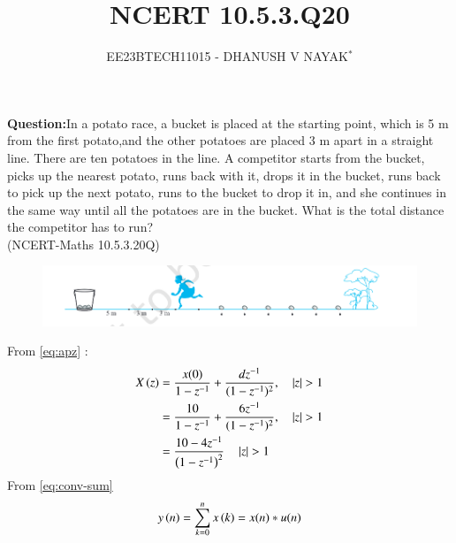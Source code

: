 \documentclass[journal,12pt,twocolumn]{IEEEtran}
\theoremstyle{remark}
\begin{document}

\title{NCERT 10.5.3.Q20}
\author{EE23BTECH11015 - DHANUSH V NAYAK$^{*}$%
}
\maketitle
\newpage
\bigskip
\renewcommand{\thefigure}{\arabic{figure}}
\renewcommand{\thetable}{\theenumi}
\textbf{Question:}In a potato race, a bucket is placed at the starting point, which is 5 m from the first potato,and the other potatoes are placed 3 m apart in a straight line. There are ten potatoes in the line. A competitor starts from the bucket, picks up the nearest potato, runs back with it, drops it in the bucket, runs back to pick up the next potato, runs to the bucket to drop it in, and she continues in the same way until all the potatoes are in the bucket. What is the total distance the competitor has to run?\\
\hfill(NCERT-Maths 10.5.3.20Q)
\begin{figure}[H]
    \includegraphics[width=1\columnwidth]{figs/questionfig.png}
    \label{fig:questionfig}
\end{figure}
\solution 

From \eqref{eq:apz} :
\begin{align}
    X\left(z\right) &= \frac{x(0)}{1-z^{-1}} + \frac{dz^{-1}}{(1-z^{-1})^{2}}, \quad \left\vert z\right\vert > 1 \\
        &= \frac{10}{1-z^{-1}} + \frac{6z^{-1}}{(1-z^{-1})^{2}}, \quad \left\vert z\right\vert > 1\\
        &= \frac{10-4z^{-1}}{\left(1-z^{-1}\right)^2} \quad \left\vert z\right\vert > 1 \label{eq:10.5.3.20.1}
\end{align}
From \eqref{eq:conv-sum}
\begin{align}
	y\left(n\right) = \sum_{k=0}^{n}x\left(k\right) = x(n)*u(n) 
\end{align}
\end{document}
